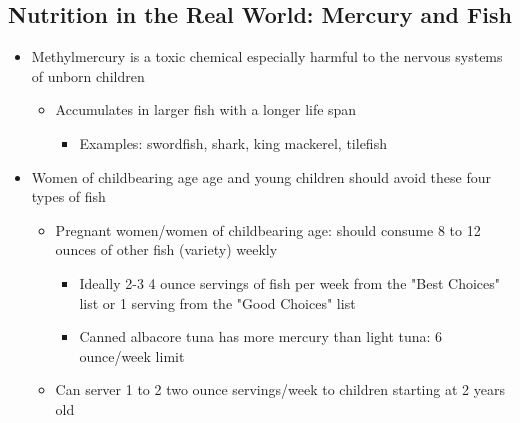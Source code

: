 \documentclass[12pt]{article}
\begin{document}
        \subsection{Nutrition in the Real World: Mercury and Fish}
            \begin{itemize}
                \item Methylmercury is a toxic chemical especially harmful to the nervous systems of unborn children
                    \begin{itemize}
                        \item Accumulates in larger fish with a longer life span
                            \begin{itemize}
                                \item Examples: swordfish, shark, king mackerel, tilefish
                            \end{itemize}
                    \end{itemize}
                \item Women of childbearing age age and young children should avoid these four types of fish
                    \begin{itemize}
                        \item Pregnant women/women of childbearing age: should consume 8 to 12 ounces of other fish (variety) weekly
                            \begin{itemize}
                                \item Ideally 2-3 4 ounce servings of fish per week from the "Best Choices" list or 1 serving from the "Good Choices" list
                                \item Canned albacore tuna has more mercury than light tuna: 6 ounce/week limit
                            \end{itemize}
                        \item Can server 1 to 2 two ounce servings/week to children starting at 2 years old
                    \end{itemize}
            \end{itemize}
\end{document}
